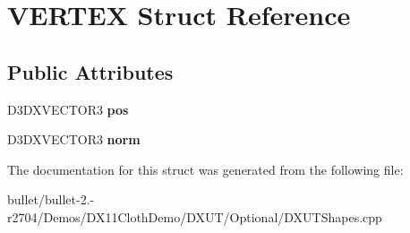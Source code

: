 \hypertarget{struct_v_e_r_t_e_x}{\section{V\+E\+R\+T\+E\+X Struct Reference}
\label{struct_v_e_r_t_e_x}
}
\subsection*{Public Attributes}
\begin{DoxyCompactItemize}
\item 
\hypertarget{struct_v_e_r_t_e_x_ae6eda612372cf9bf472ca2d59ddc4cb1}{D3\+D\+X\+V\+E\+C\+T\+O\+R3 {\bfseries pos}}\label{struct_v_e_r_t_e_x_ae6eda612372cf9bf472ca2d59ddc4cb1}

\item 
\hypertarget{struct_v_e_r_t_e_x_a8de400e00b4ee73b57de5ad02f880dd9}{D3\+D\+X\+V\+E\+C\+T\+O\+R3 {\bfseries norm}}\label{struct_v_e_r_t_e_x_a8de400e00b4ee73b57de5ad02f880dd9}

\end{DoxyCompactItemize}


The documentation for this struct was generated from the following file\+:\begin{DoxyCompactItemize}
\item 
bullet/bullet-\/2.-\/r2704/\+Demos/\+D\+X11\+Cloth\+Demo/\+D\+X\+U\+T/\+Optional/D\+X\+U\+T\+Shapes.\+cpp\end{DoxyCompactItemize}
